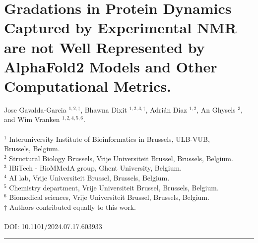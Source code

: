 \chapter{Gradations in Protein Dynamics Captured by Experimental NMR are not Well Represented by AlphaFold2 Models and Other Computational Metrics.}\label{chapter:plddt}

\setcounter{figure}{0} %
\renewcommand{\figurename}{Figure}

\setcounter{table}{0} %
\renewcommand{\tablename}{Table}

Jose Gavalda-Garcia $^{1,2,\dag}$, Bhawna Dixit $^{1,2,3,\dag}$, Adrián Díaz $^{1,2}$, An Ghysels $^{3}$, and Wim Vranken $^{1,2,4,5,6}$.
\\
\\
$^{1}$ Interuniversity Institute of Bioinformatics in Brussels, ULB-VUB, \\Brussels, Belgium.
\\
$^{2}$ Structural Biology Brussels, Vrije Universiteit Brussel, Brussels, Belgium.
\\
$^{3}$ IBiTech - BioMMedA group, Ghent University, Belgium.
\\
$^{4}$ AI lab, Vrije Universiteit Brussel, Brussels, Belgium.
\\
$^{5}$ Chemistry department, Vrije Universiteit Brussel, Brussels, Belgium.
\\
$^{6}$ Biomedical sciences, Vrije Universiteit Brussel, Brussels, Belgium.
\\
$\dag$ Authors contributed equally to this work.
\\
\\
DOI: 10.1101/2024.07.17.603933
\vspace{1em}
\hrule
\vspace{1em}

